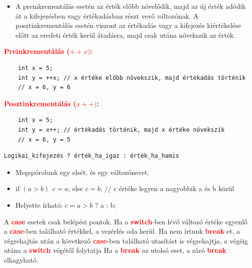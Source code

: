 \documentclass[11pt,a4paper]{article}
\begin{document}
            \begin{tcolorbox}[colback=blue!5!white,colframe=blue!50!black,title= 48. Ismertesse példával a pre-és posztinkrementálás közti különbséget!]
                \begin{itemize}
                    \item A preinkrementálás esetén az érték előbb növelődik, majd az új érték adódik át a kifejezésben vagy értékadásban részt vevő változónak. A posztinkrementálás esetén viszont az értékadás vagy a kifejezés kiértékelése előtt az eredeti érték kerül átadásra, majd csak utána növekszik az érték.
                \end{itemize}
                \textcolor{red}{\textbf{Preinkrementálás (\(++x)\):}}
                \begin{Verbatim}
    int x = 5;
    int y = ++x; // x értéke előbb növekszik, majd értékadás történik
    // x = 6, y = 6
                \end{Verbatim}
                \textcolor{red}{\textbf{Posztinkrementálás (\(x++)\):}}
                \begin{Verbatim}
    int x = 5;
    int y = x++; // értékadás történik, majd x értéke növekszik 
    // x = 6, y = 5
                \end{Verbatim}
            \end{tcolorbox}

            \begin{tcolorbox}[colback=blue!5!white,colframe=blue!50!black,title= 49.  Ismertesse a C nyelv háromoperandusú operátorát!]
            \begin{Verbatim}
Logikai_kifejezés ? érték_ha_igaz : érték_ha_hamis
            \end{Verbatim}
                \begin{itemize}
                    \item Megspórolunk egy elsét, és egy változónevet.
                    \item if \((a>b)\hspace{5pt} c=a\); else \(c=b\); // c értéke legyen a nagyobbik a és b közül
                    \item Helyette írható: \(c = a>b\) ? a : b;
                \end{itemize}
            \end{tcolorbox}

            \begin{tcolorbox}[colback=blue!5!white,colframe=blue!50!black,title= 50. Ismertesse a „break” utasítás szerepét a „switch” utasításban!]
                A \textcolor{red}{\textbf{case}} esetek csak belépési pontok. Ha a \textcolor{red}{\textbf{switch}}-ben lévő változó értéke egyenlő a \textcolor{red}{\textbf{case}}-ben található értékkel, a vezérlés oda kerül. Ha nem írtunk \textcolor{red}{\textbf{break}}-et, a végrehajtás után a következő \textcolor{red}{\textbf{case}}-ben található utasítást is végrehajtja, a végéig  utána a \textcolor{red}{\textbf{switch}} végétől folytatja Ha a \textcolor{red}{\textbf{break}} az utolsó eset, a záró \textcolor{red}{\textbf{break}} elhagyható.
            \end{tcolorbox}
\end{document}
